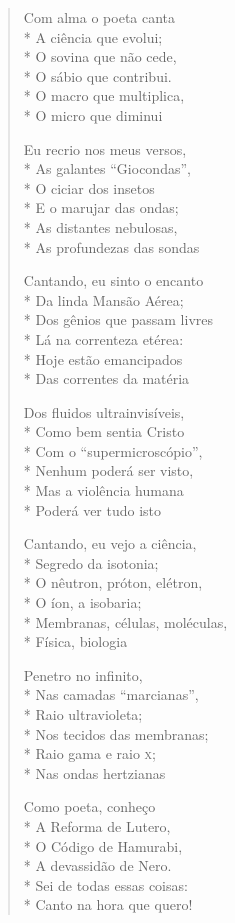 \begin{verse}
Com alma o poeta canta\\*
A ciência que evolui;\\*
O sovina que não cede,\\*
O sábio que contribui.\\*
O macro que multiplica,\\*
O micro que diminui

Eu recrio nos meus versos,\\*
As galantes “Giocondas”,\\*
O ciciar dos insetos\\*
E o marujar das ondas;\\*
As distantes nebulosas,\\*
As profundezas das sondas

Cantando, eu sinto o encanto\\*
Da linda Mansão Aérea;\\*
Dos gênios que passam livres\\*
Lá na correnteza etérea:\\*
Hoje estão emancipados\\*
Das correntes da matéria

Dos fluidos ultrainvisíveis,\\*
Como bem sentia Cristo\\*
Com o “supermicroscópio”,\\*
Nenhum poderá ser visto,\\*
Mas a violência humana\\*
Poderá ver tudo isto

Cantando, eu vejo a ciência,\\*
Segredo da isotonia;\\*
O nêutron, próton, elétron,\\*
O íon, a isobaria;\\*
Membranas, células, moléculas,\\*
Física, biologia

Penetro no infinito,\\*
Nas camadas “marcianas”,\\*
Raio ultravioleta;\\*
Nos tecidos das membranas;\\*
Raio gama e raio \textsc{x};\\*
Nas ondas hertzianas

Como poeta, conheço\\*
A Reforma de Lutero,\\*
O Código de Hamurabi,\\*
A devassidão de Nero.\\*
Sei de todas essas coisas:\\*
Canto na hora que quero!


\end{verse}
